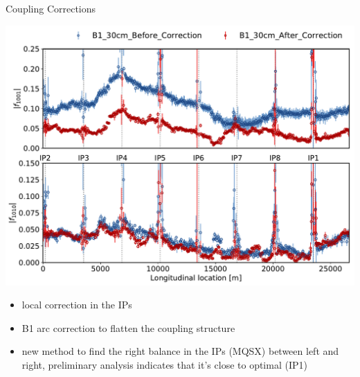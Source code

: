 \documentclass[4pt,usenames,dvipsnames,aspectratio=169,table]{beamer}
\begin{document}
\begin{frame}{Coupling Corrections}
    \begin{minipage}{0.55\linewidth}
        \includegraphics[width=\linewidth]{lhcb1_30cm_before_vs_after_arc_by_arc_coupling.pdf}
    \end{minipage}
    \begin{minipage}{0.44\linewidth}
        \begin{itemize}
            \item local correction in the IPs
            \item B1 arc correction to flatten the coupling structure
            \item new method to find the right balance in the IPs (MQSX) between left and right,
            preliminary analysis indicates that it's close to optimal (IP1)
        \end{itemize}
    \end{minipage}
\end{frame}

\end{document}
